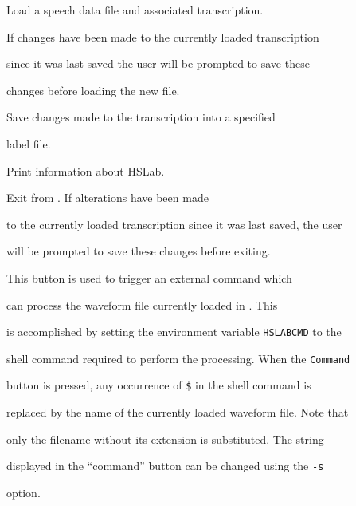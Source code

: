 \begin{optlist}


   Load a speech data file and associated transcription.


      If changes have been made to the currently loaded transcription 


      since it was last saved the user will be prompted to save these 


      changes before loading the new file.





   Save changes made to the transcription into a specified


      label file.





   Print information about HSLab.





   Exit from . If alterations have been made 


      to the currently loaded transcription since it was last saved, the user 


      will be prompted to save these changes before exiting.





   This button is used to trigger an external command which 


      can process the waveform file currently loaded in . This 


      is accomplished by setting the environment variable \texttt{HSLABCMD} to the 


      shell command required to perform the processing. When the \texttt{Command}


      button is pressed, any occurrence of \texttt{\$} in the shell command is 


      replaced by the name of the currently loaded waveform file. Note that 


      only the filename without its extension is substituted. The string 


      displayed in the ``command'' button can be changed using the \texttt{-s} 


      option.






\end{optlist}
